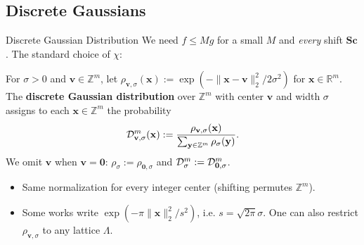 \documentclass{zkdl-presentation-template}
\begin{document}
    \subsection{Discrete Gaussians}

    \begin{frame}{Discrete Gaussian Distribution}
        We need $f \leq Mg$ for a small $M$ and \emph{every} shift $\mathbf{S}\mathbf{c}$. The standard choice of $\chi$:
        \begin{definition}
            For $\sigma > 0$ and $\mathbf{v} \in \mathbb{Z}^m$, let $\rho_{\mathbf{v},\sigma}(\mathbf{x}) := \exp\left(-\|\mathbf{x}-\mathbf{v}\|_2^2/2\sigma^2\right)$ for $\mathbf{x} \in \mathbb{R}^m$.
            The \textbf{discrete Gaussian distribution} over $\mathbb{Z}^m$ with center $\mathbf{v}$ and width $\sigma$ assigns to each $\mathbf{x} \in \mathbb{Z}^m$ the probability
            \begin{equation*}
                \mathcal{D}^m_{\mathbf{v},\sigma}(\mathbf{x}) := \frac{\rho_{\mathbf{v},\sigma}(\mathbf{x})}{\sum_{\mathbf{y} \in \mathbb{Z}^m}\rho_{\sigma}(\mathbf{y})}.
            \end{equation*}
            We omit $\mathbf{v}$ when $\mathbf{v} = \mathbf{0}$: $\rho_{\sigma} := \rho_{\mathbf{0},\sigma}$ and $\mathcal{D}^m_{\sigma} := \mathcal{D}^m_{\mathbf{0},\sigma}$.
        \end{definition}
        \pause

        \begin{itemize}
            \item Same normalization for every integer center (shifting permutes $\mathbb{Z}^m$).
            \item Some works write $\exp(-\pi\|\mathbf{x}\|_2^2/s^2)$, i.e. $s = \sqrt{2\pi}\sigma$. One can also restrict $\rho_{\mathbf{v},\sigma}$ to any lattice $\Lambda$.
        \end{itemize}
    \end{frame}
\end{document}
